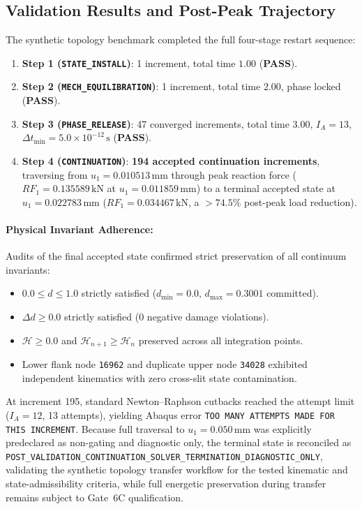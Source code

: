 \subsection{Validation Results and Post-Peak Trajectory}
The synthetic topology benchmark completed the full four-stage restart sequence:
\begin{enumerate}
    \item \textbf{Step 1 (\texttt{STATE\_INSTALL})}: 1 increment, total time $1.00$ (\textbf{PASS}).
    \item \textbf{Step 2 (\texttt{MECH\_EQUILIBRATION})}: 1 increment, total time $2.00$, phase locked (\textbf{PASS}).
    \item \textbf{Step 3 (\texttt{PHASE\_RELEASE})}: 47 converged increments, total time $3.00$, $I_A = 13$, $\Delta t_{\min} = 5.0\times 10^{-12}\,\text{s}$ (\textbf{PASS}).
    \item \textbf{Step 4 (\texttt{CONTINUATION})}: \textbf{194 accepted continuation increments}, traversing from $u_1 = 0.010513\,\text{mm}$ through peak reaction force ($RF_1 = 0.135589\,\text{kN}$ at $u_1 = 0.011859\,\text{mm}$) to a terminal accepted state at $u_1 = 0.022783\,\text{mm}$ ($RF_1 = 0.034467\,\text{kN}$, a $>74.5\%$ post-peak load reduction).
\end{enumerate}

\paragraph{Physical Invariant Adherence:}
Audits of the final accepted state confirmed strict preservation of all continuum invariants:
\begin{itemize}
    \item $0.0 \le d \le 1.0$ strictly satisfied ($d_{\min} = 0.0$, $d_{\max} = 0.3001$ committed).
    \item $\Delta d \ge 0.0$ strictly satisfied ($0$ negative damage violations).
    \item $\mathcal{H} \ge 0.0$ and $\mathcal{H}_{n+1} \ge \mathcal{H}_n$ preserved across all integration points.
    \item Lower flank node \texttt{16962} and duplicate upper node \texttt{34028} exhibited independent kinematics with zero cross-slit state contamination.
\end{itemize}

At increment 195, standard Newton--Raphson cutbacks reached the attempt limit ($I_A = 12$, 13 attempts), yielding Abaqus error \texttt{TOO MANY ATTEMPTS MADE FOR THIS INCREMENT}. Because full traversal to $u_1 = 0.050\,\text{mm}$ was explicitly predeclared as non-gating and diagnostic only, the terminal state is reconciled as \texttt{POST\_VALIDATION\_CONTINUATION\_SOLVER\_TERMINATION\_DIAGNOSTIC\_ONLY}, validating the synthetic topology transfer workflow for the tested kinematic and state-admissibility criteria, while full energetic preservation during transfer remains subject to Gate~6C qualification.

